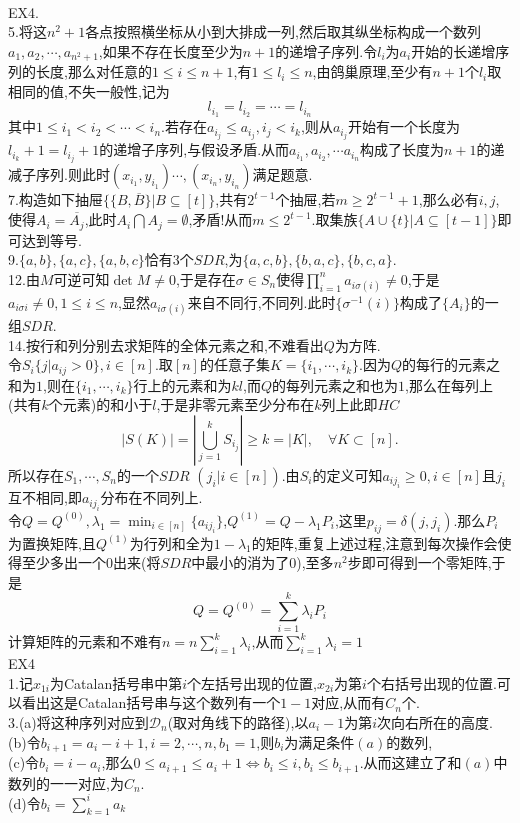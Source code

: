 \documentclass[b5paper]{ctexart}
\begin{document}
\pagestyle{plain}
\noindent
\\
EX4.\\
5.将这$n^2+1$各点按照横坐标从小到大排成一列,然后取其纵坐标构成一个数列$a_1,a_2,\cdots,a_{n^2+1}$,如果不存在长度至少为$n+1$的递增子序列.令$l_i$为$a_i$开始的长递增序列的长度,那么对任意的$1\leq i\leq n+1$,有$1\leq l_i\leq n$,由鸽巢原理,至少有$n+1$个$l_i$取相同的值,不失一般性,记为
\[l_{i_1}=l_{i_2}=\cdots=l_{i_n}\]
其中$1\leq i_1<i_2<\cdots <i_n$.若存在$a_{i_j}\leq a_{i_j},i_j<i_k$,则从$a_{i_j}$开始有一个长度为$l_{i_k}+1=l_{i_j}+1$的递增子序列,与假设矛盾.从而$a_{i_1},a_{i_2},\cdots a_{i_n}$构成了长度为$n+1$的递减子序列.则此时$(x_{i_1},y_{i_1})\cdots,(x_{i_n},y_{i_n})$满足题意.\\
7.构造如下抽屉$\{\{B,\overline{B}\}|B\subseteq [t]\}$,共有$2^{t-1}$个抽屉,若$m\geq 2^{t-1}+1$,那么必有$i,j$,使得$A_i=\overline{A_j}$,此时$A_i\bigcap A_j=\emptyset$,矛盾!从而$m\leq 2^{t-1}$.取集族$\{A\cup \{t\}|A\subseteq [t-1]\}$即可达到等号.\\
9.$\{a,b\},\{a,c\},\{a,b,c\}$恰有3个$SDR$,为$\{a,c,b\},\{b,a,c\},\{b,c,a\}$.\\
12.由$M$可逆可知$\det{M}\neq 0$,于是存在$\sigma\in S_n$使得$\prod\limits_{i=1}^na_{i\sigma(i)}\neq 0$,于是$a_{i\sigma{i}}\neq 0,1\leq i\leq n$,显然$a_{i\sigma(i)}$来自不同行,不同列.此时$\{\sigma^{-1}(i)\}$构成了$\{A_i\}$的一组$SDR$.\\
14.按行和列分别去求矩阵的全体元素之和,不难看出$Q$为方阵.\\
令$S_i\{j|a_{ij}>0\},i\in [n]$.取$[n]$的任意子集$K=\{i_1,\cdots,i_k\}.$因为$Q$的每行的元素之和为$1$,则在$\{i_1,\cdots,i_k\}$行上的元素和为$kl$,而$Q$的每列元素之和也为$1$,那么在每列上(共有$k$个元素)的和小于$l$,于是非零元素至少分布在$k$列上此即$HC$
\[|S(K)|=\left| \bigcup_{j=1}^kS_{i_j}\right|\geq k=|K|,\quad \forall K\subset [n]. \]
所以存在$S_1,\cdots ,S_n$的一个$SDR$ $(j_i|i\in [n])$.由$S_i$的定义可知$a_{ij_i}\geq 0,i\in [n]$且$j_i$互不相同,即$a_{ij_i}$分布在不同列上.\\
令$Q=Q^{(0)},\lambda_1=\min_{i\in [n]}\{a_{ij_i}\}$,$Q^{(1)}=Q-\lambda_1P_i$,这里$p_{ij}=\delta(j,j_i).$那么$P_i$为置换矩阵,且$Q^{(1)}$为行列和全为$1-\lambda_1$的矩阵,重复上述过程,注意到每次操作会使得至少多出一个$0$出来(将$SDR$中最小的消为了$0$),至多$n^2$步即可得到一个零矩阵,于是
\[Q=Q^{(0)}=\sum_{i=1}^k\lambda_iP_i\]
计算矩阵的元素和不难有$n=n\sum_{i=1}^k\lambda_i$,从而$\sum_{i=1}^k\lambda_i=1$\\
EX4\\
1.记$x_{1i}$为Catalan括号串中第$i$个左括号出现的位置,$x_{2i}$为第$i$个右括号出现的位置.可以看出这是Catalan括号串与这个数列有一个$1-1$对应,从而有$C_n$个.\\
3.(a)将这种序列对应到$\mathcal{D}_n$(取对角线下的路径),以$a_i-1$为第$i$次向右所在的高度.\\
(b)令$b_{i+1}=a_i-i+1,i=2,\cdots,n,b_1=1$,则$b_i$为满足条件$(a)$的数列,\\
(c)令$b_i=i-a_i$,那么$0\leq a_{i+1}\leq a_i+1\Leftrightarrow b_i\leq i,b_i\leq b_{i+1}$.从而这建立了和$(a)$中数列的一一对应,为$C_n$.\\
(d)令$b_i=\sum\limits_{k=1}^ia_k$
\end{document}
